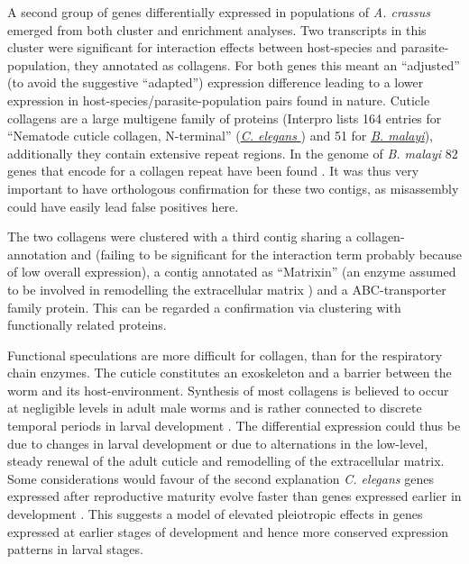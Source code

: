A second group of genes differentially expressed in populations of
\textit{A. crassus} emerged from both cluster and enrichment
analyses. Two transcripts in this cluster were significant for
interaction effects between host-species and parasite-population,
they annotated as collagens. For both genes this meant an
``adjusted'' (to avoid the suggestive ``adapted'') expression
difference leading to a lower expression in
host-species/parasite-population pairs found in nature. Cuticle
collagens are a large multigene family of proteins (Interpro lists 164
entries for ``Nematode cuticle collagen, N-terminal''
(\href{http://www.ebi.ac.uk/interpro/ISpy?ipr=IPR002486&tax=6239}{\textit{C. elegans}
}) and 51 for
\href{http://www.ebi.ac.uk/interpro/ISpy?ipr=IPR002486&tax=6279}{\textit{B. malayi}}),
additionally they contain extensive repeat regions. In the genome of
\textit{B. malayi} 82 genes that encode for a collagen repeat have
been found \cite{ghedin_draft_2007}. It was thus very important to
have orthologous confirmation for these two contigs, as misassembly
could have easily lead false positives here.

The two collagens were clustered with a third contig sharing a
collagen-annotation and (failing to be significant for the interaction
term probably because of low overall expression), a contig annotated
as ``Matrixin'' (an enzyme assumed to be involved in remodelling the
extracellular matrix \cite{mealloprot}) and a ABC-transporter family
protein. This can be regarded a confirmation via clustering with
functionally related proteins.

Functional speculations are more difficult for collagen, than for the
respiratory chain enzymes. The cuticle constitutes an exoskeleton and
a barrier between the worm and its host-environment. Synthesis of most
collagens is believed to occur at negligible levels in adult male
worms and is rather connected to discrete temporal periods in larval
development \cite{pmid10637627}. The differential expression could thus
be due to changes in larval development or due to alternations in the
low-level, steady renewal of the adult cuticle and remodelling of the
extracellular matrix. Some considerations would favour of the second
explanation \textit{C. elegans} genes expressed after reproductive
maturity evolve faster than genes expressed earlier in development
\cite{pmid15371532}. This suggests a model of elevated pleiotropic
effects in genes expressed at earlier stages of development and hence
more conserved expression patterns in larval stages.

